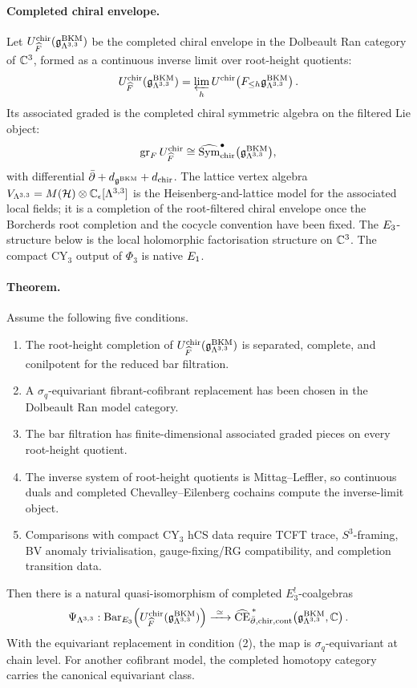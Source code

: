 \paragraph{Completed chiral envelope.}
Let $U^{\mathrm{chir}}_{\widehat F}(\mathfrak{g}^{\mathrm{BKM}}_{\Lambda^{3,3}})$ be the completed
chiral envelope in the Dolbeault Ran category of $\mathbb{C}^3$, formed as a
continuous inverse limit over root-height quotients:
\[
  U^{\mathrm{chir}}_{\widehat F}(\mathfrak{g}^{\mathrm{BKM}}_{\Lambda^{3,3}})
  =
  \varprojlim_h
  U^{\mathrm{chir}}\!\left(F_{\leq h}\mathfrak{g}^{\mathrm{BKM}}_{\Lambda^{3,3}}\right).
\]
Its associated graded is the completed chiral symmetric algebra on the
filtered Lie object:
\[
  \operatorname{gr}_F U^{\mathrm{chir}}_{\widehat F}
  \cong
  \widehat{\mathrm{Sym}}^{\bullet}_{\mathrm{chir}}
  \bigl(\mathfrak{g}^{\mathrm{BKM}}_{\Lambda^{3,3}}\bigr),
\]
with differential $\bar\partial+d_{\mathfrak{g}^{\mathrm{BKM}}}+d_{\mathrm{chir}}$.  The lattice vertex
algebra $V_{\Lambda^{3,3}}=M(\mathcal{H})\otimes \mathbb{C}_\epsilon[\Lambda^{3,3}]$ is the
Heisenberg-and-lattice model for the associated local fields; it is a
completion of the root-filtered chiral envelope once the Borcherds
root completion and the cocycle convention have been fixed.
The $E_3$-structure below is the local holomorphic factorisation
structure on $\mathbb{C}^3$.  The compact CY$_3$ output of $\Phi_3$ is native
$E_1$.

\paragraph{Theorem.}
Assume the following five conditions.
\begin{enumerate}
  \item The root-height completion of
    $U^{\mathrm{chir}}_{\widehat F}(\mathfrak{g}^{\mathrm{BKM}}_{\Lambda^{3,3}})$ is separated,
    complete, and conilpotent for the reduced bar filtration.
  \item A $\sigma_q$-equivariant fibrant-cofibrant replacement has been
    chosen in the Dolbeault Ran model category.
  \item The bar filtration has finite-dimensional associated graded
    pieces on every root-height quotient.
  \item The inverse system of root-height quotients is Mittag--Leffler,
    so continuous duals and completed Chevalley--Eilenberg cochains
    compute the inverse-limit object.
  \item Comparisons with compact CY$_3$ hCS data require TCFT trace,
    $S^3$-framing, BV anomaly trivialisation, gauge-fixing/RG
    compatibility, and completion transition data.
\end{enumerate}
Then there is a natural quasi-isomorphism of completed
$E_3^!$-coalgebras
\[
  \Psi_{\Lambda^{3,3}}:
  \mathrm{Bar}_{E_3}
  \!\left(U^{\mathrm{chir}}_{\widehat F}(\mathfrak{g}^{\mathrm{BKM}}_{\Lambda^{3,3}})\right)
  \xrightarrow{\ \simeq\ }
  \widehat{\mathrm{CE}}^{\,*}_{\bar\partial,\mathrm{chir},\mathrm{cont}}
  \!\left(\mathfrak{g}^{\mathrm{BKM}}_{\Lambda^{3,3}},\mathbb{C}\right).
\]
With the equivariant replacement in condition \textup{(2)}, the map is
$\sigma_q$-equivariant at chain level.  For another cofibrant model,
the completed homotopy category carries the canonical equivariant
class.

